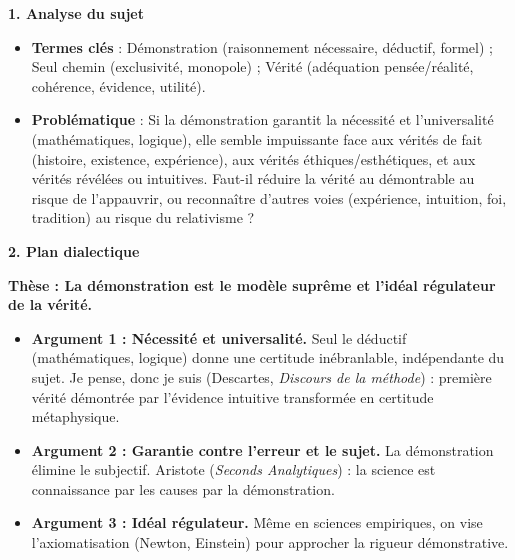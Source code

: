 \documentclass[11pt]{article}
\newcommand{\cle}[1]{{\popxbold\color{popdark}#1}}
\begin{document}
\begin{exoresolu}
\textbf{1. Analyse du sujet}
\begin{itemize}
    \item \textbf{Termes clés} : \cle{Démonstration} (raisonnement nécessaire, déductif, formel) ; \cle{Seul chemin} (exclusivité, monopole) ; \cle{Vérité} (adéquation pensée/réalité, cohérence, évidence, utilité).
    \item \textbf{Problématique} : Si la démonstration garantit la nécessité et l'universalité (mathématiques, logique), elle semble impuissante face aux vérités de fait (histoire, existence, expérience), aux vérités éthiques/esthétiques, et aux vérités révélées ou intuitives. Faut-il réduire la vérité au démontrable au risque de l'appauvrir, ou reconnaître d'autres voies (expérience, intuition, foi, tradition) au risque du relativisme ?
\end{itemize}

\textbf{2. Plan dialectique}

\textbf{Thèse : La démonstration est le modèle suprême et l'idéal régulateur de la vérité.}
\begin{itemize}
    \item \textbf{Argument 1 : Nécessité et universalité.} Seul le déductif (mathématiques, logique) donne une certitude inébranlable, indépendante du sujet. \guillemotleft Je pense, donc je suis \guillemotright (Descartes, \emph{Discours de la méthode}) : première vérité démontrée par l'évidence intuitive transformée en certitude métaphysique.
    \item \textbf{Argument 2 : Garantie contre l'erreur et le sujet.} La démonstration élimine le subjectif. Aristote (\emph{Seconds Analytiques}) : la science est connaissance par les causes par la démonstration.
    \item \textbf{Argument 3 : Idéal régulateur.} Même en sciences empiriques, on vise l'axiomatisation (Newton, Einstein) pour approcher la rigueur démonstrative.
\end{itemize}


\end{exoresolu}
\end{document}
